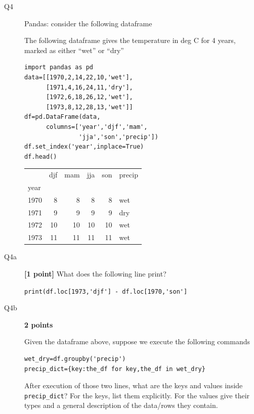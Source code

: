 \documentclass{article}
\begin{document}
\newpage
\begin{description}

\item[Q4]  Pandas: consider the following dataframe  

  The following dataframe gives the temperature in deg C for 4 years, marked
  as either ``wet'' or ``dry''
  
\begin{lstlisting}[firstnumber=1]  
import pandas as pd
data=[[1970,2,14,22,10,'wet'],
      [1971,4,16,24,11,'dry'],
      [1972,6,18,26,12,'wet'],
      [1973,8,12,28,13,'wet']]
df=pd.DataFrame(data,
      columns=['year','djf','mam',
               'jja','son','precip'])
df.set_index('year',inplace=True)
df.head()
\end{lstlisting}

\begin{tabular}{lrrrrl}
\toprule
{} &  djf &  mam &  jja &  son & precip \\
year &      &      &      &      &        \\
\midrule
1970 &    8 &    8 &    8 &    8 &      wet \\
1971 &    9 &    9 &    9 &    9 &      dry \\
1972 &   10 &   10 &   10 &   10 &      wet \\
1973 &   11 &   11 &   11 &   11 &      wet \\
\bottomrule
\end{tabular}

\item[Q4a] \textbf{[1 point]} What does the following line print?

\verb+print(df.loc[1973,'djf'] - df.loc[1970,'son']+

\vspace{1cm}

\item[Q4b]\textbf{2 points}

  Given the dataframe above, suppose we execute the following commands

\begin{verbatim}  
wet_dry=df.groupby('precip')
precip_dict={key:the_df for key,the_df in wet_dry}
\end{verbatim}  

  After execution of those two lines, what are the keys and values inside
  \verb+precip_dict+?  For the keys, list them explicitly. For the values
  give their types and a general description of the data/rows they contain.


\end{description}
\end{document}
